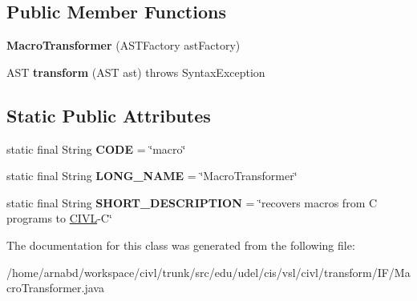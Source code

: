 \subsection*{Public Member Functions}
\begin{DoxyCompactItemize}
\item 
\hypertarget{classedu_1_1udel_1_1cis_1_1vsl_1_1civl_1_1transform_1_1IF_1_1MacroTransformer_a5e85e96611349a238c906e88314c9f91}{}{\bfseries Macro\+Transformer} (A\+S\+T\+Factory ast\+Factory)\label{classedu_1_1udel_1_1cis_1_1vsl_1_1civl_1_1transform_1_1IF_1_1MacroTransformer_a5e85e96611349a238c906e88314c9f91}

\item 
\hypertarget{classedu_1_1udel_1_1cis_1_1vsl_1_1civl_1_1transform_1_1IF_1_1MacroTransformer_a0e4f26c52e5fb144bed6a2d581be8b09}{}A\+S\+T {\bfseries transform} (A\+S\+T ast)  throws Syntax\+Exception \label{classedu_1_1udel_1_1cis_1_1vsl_1_1civl_1_1transform_1_1IF_1_1MacroTransformer_a0e4f26c52e5fb144bed6a2d581be8b09}

\end{DoxyCompactItemize}
\subsection*{Static Public Attributes}
\begin{DoxyCompactItemize}
\item 
\hypertarget{classedu_1_1udel_1_1cis_1_1vsl_1_1civl_1_1transform_1_1IF_1_1MacroTransformer_aebb9b5f2d14dcd0be910b7cc6d036160}{}static final String {\bfseries C\+O\+D\+E} = \char`\"{}macro\char`\"{}\label{classedu_1_1udel_1_1cis_1_1vsl_1_1civl_1_1transform_1_1IF_1_1MacroTransformer_aebb9b5f2d14dcd0be910b7cc6d036160}

\item 
\hypertarget{classedu_1_1udel_1_1cis_1_1vsl_1_1civl_1_1transform_1_1IF_1_1MacroTransformer_a8d5b9c3ee1f97c539f044af25abfe818}{}static final String {\bfseries L\+O\+N\+G\+\_\+\+N\+A\+M\+E} = \char`\"{}Macro\+Transformer\char`\"{}\label{classedu_1_1udel_1_1cis_1_1vsl_1_1civl_1_1transform_1_1IF_1_1MacroTransformer_a8d5b9c3ee1f97c539f044af25abfe818}

\item 
\hypertarget{classedu_1_1udel_1_1cis_1_1vsl_1_1civl_1_1transform_1_1IF_1_1MacroTransformer_ab587282bdb785932de2fa539009333c3}{}static final String {\bfseries S\+H\+O\+R\+T\+\_\+\+D\+E\+S\+C\+R\+I\+P\+T\+I\+O\+N} = \char`\"{}recovers macros from C programs to \hyperlink{classedu_1_1udel_1_1cis_1_1vsl_1_1civl_1_1CIVL}{C\+I\+V\+L}-\/C\char`\"{}\label{classedu_1_1udel_1_1cis_1_1vsl_1_1civl_1_1transform_1_1IF_1_1MacroTransformer_ab587282bdb785932de2fa539009333c3}

\end{DoxyCompactItemize}


The documentation for this class was generated from the following file\+:\begin{DoxyCompactItemize}
\item 
/home/arnabd/workspace/civl/trunk/src/edu/udel/cis/vsl/civl/transform/\+I\+F/Macro\+Transformer.\+java\end{DoxyCompactItemize}
